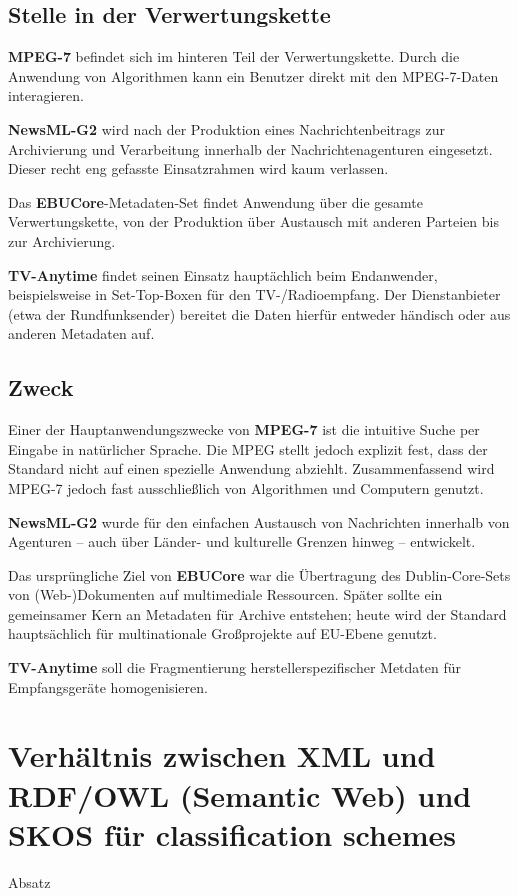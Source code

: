 	\subsection{Stelle in der Verwertungskette}
	\textbf{MPEG-7} befindet sich im hinteren Teil der Verwertungskette. Durch die Anwendung von Algorithmen kann ein Benutzer direkt mit den MPEG-7-Daten interagieren. %
	
	\textbf{NewsML-G2} wird nach der Produktion eines Nachrichtenbeitrags zur Archivierung und Verarbeitung innerhalb der Nachrichtenagenturen eingesetzt. Dieser recht eng gefasste Einsatzrahmen wird kaum verlassen.
	
	Das \textbf{EBUCore}-Metadaten-Set findet Anwendung über die gesamte Verwertungskette, von der Produktion über Austausch mit anderen Parteien bis zur Archivierung.
	
	\textbf{TV-Anytime} findet seinen Einsatz hauptächlich beim Endanwender, beispielsweise in Set-Top-Boxen für den TV-/Radioempfang. Der Dienstanbieter (etwa der Rundfunksender) bereitet die Daten hierfür entweder händisch oder aus anderen Metadaten auf.

	\subsection{Zweck}
	Einer der Hauptanwendungszwecke von \textbf{MPEG-7} ist die intuitive Suche per Eingabe in natürlicher Sprache. Die MPEG stellt jedoch explizit fest, dass der Standard nicht auf einen spezielle Anwendung abziehlt. Zusammenfassend wird MPEG-7 jedoch fast ausschließlich von Algorithmen und Computern genutzt.

	\textbf{NewsML-G2} wurde für den einfachen Austausch von Nachrichten innerhalb von Agenturen -- auch über Länder- und kulturelle Grenzen hinweg -- entwickelt. 
	
	Das ursprüngliche Ziel von \textbf{EBUCore} war die Übertragung des Dublin-Core-Sets von (Web-)Dokumenten auf multimediale Ressourcen. Später sollte ein gemeinsamer Kern an Metadaten für Archive entstehen; heute wird der Standard hauptsächlich für multinationale Großprojekte auf EU-Ebene genutzt. 
	
	\textbf{TV-Anytime} soll die Fragmentierung herstellerspezifischer Metdaten für Empfangsgeräte homogenisieren. 
	
	\newpage
	\section{Verhältnis zwischen XML und RDF/OWL (Semantic Web) und SKOS für classification schemes}
	Absatz

